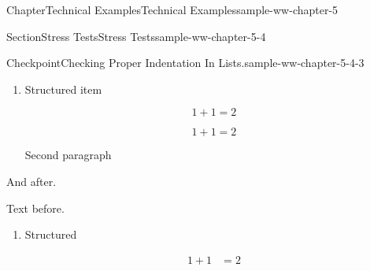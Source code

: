 \documentclass[oneside,10pt,]{book}
\numberwithin{equation}{section}
\newcommand{\amp}{&}
\begin{document}
\begin{chapterptx}{Chapter}{Technical Examples}{}{Technical Examples}{}{}{sample-ww-chapter-5}
\begin{sectionptx}{Section}{Stress Tests}{}{Stress Tests}{}{}{sample-ww-chapter-5-4}
\begin{inlineexercise}{Checkpoint}{Checking Proper Indentation In Lists.}{sample-ww-chapter-5-4-3}
\begin{enumerate}[label={\alph*.}]
\begin{enumerate}[label={\Alph*.}]
%
\par
Item%
\par
Second paragraph%
\par
%
\begin{equation*}
1+1=2
\end{equation*}
%
\item{}~%
\par
%
\begin{equation*}
1+1=2
\end{equation*}
%
\par
Sublist Item%
\par
Second%
\par
%
\begin{equation*}
1+1=2
\end{equation*}
%
\par
paragraph%
\item{}Sublist Item%
\par
%
\begin{equation*}
1+1=2
\end{equation*}
%
\par
%
\begin{equation*}
1+1=2
\end{equation*}
%
\par
Second paragraph%
\end{enumerate}
%
\par
And%
\par
%
\begin{equation*}
1+1=2
\end{equation*}
%
\par
after.%
\item{}Structured item%
\par
%
\begin{equation*}
1+1=2
\end{equation*}
%
\par
%
\begin{equation*}
1+1=2
\end{equation*}
%
\par
Second paragraph%
\end{enumerate}
%
\par
And after.%
\par
Text before.%
\begin{enumerate}[label={\alph*.}]
\item{}Structured%
\par
%
\begin{equation*}
\begin{aligned}
1+1\amp=2\\

\end{aligned}
\end{equation*}
\end{enumerate}
\end{inlineexercise}
\end{sectionptx}
\end{chapterptx}
\end{document}
